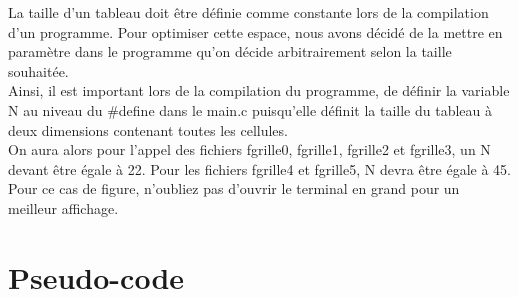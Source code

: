 \documentclass[12,french]{report}
\begin{document}
La taille d’un tableau doit être définie comme constante lors de la compilation d’un programme.
Pour optimiser cette espace, nous avons décidé de la mettre en paramètre dans le programme qu’on
décide arbitrairement selon la taille souhaitée.\\

Ainsi, il est important lors de la compilation du programme, de définir la variable N au niveau du
\#define dans le main.c puisqu’elle définit la taille du tableau à deux dimensions contenant toutes les
cellules.\\

On aura alors pour l’appel des fichiers fgrille0, fgrille1, fgrille2 et fgrille3, un N devant être égale
à 22. Pour les fichiers fgrille4 et fgrille5, N devra être égale à 45. Pour ce cas de figure, n’oubliez pas
d’ouvrir le terminal en grand pour un meilleur affichage.

\section{Pseudo-code}
\end{document}
